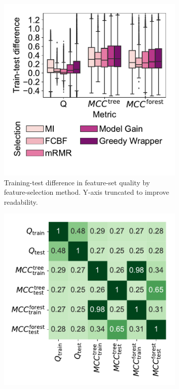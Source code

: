 \documentclass{article}
\theoremstyle{definition}
\begin{document}
\begin{figure}[htb]
	\centering
	\begin{subfigure}[t]{0.48\textwidth}
		\centering
		\includegraphics[width=\textwidth, trim=15 15 15 15, clip]{plots/afs-evaluation-metrics-overfitting.pdf}
		\caption{
			Training-test difference in feature-set quality by feature-selection method.
			Y-axis truncated to improve readability.
		}
		\label{fig:afs:evaluation-metrics-overfitting}
	\end{subfigure}
	\hfill
	\begin{subfigure}[t]{0.48\textwidth}
		\centering
		\includegraphics[width=\textwidth, trim=15 15 15 15, clip]{plots/afs-evaluation-metrics-correlation.pdf}

\end{subfigure}
\end{figure}
\end{document}
